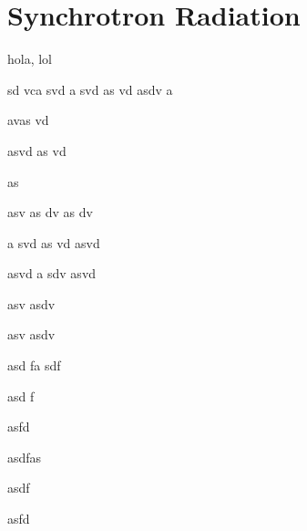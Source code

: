 \chapter{Synchrotron Radiation}

\label{c:sr} %


hola, lol


sd
vca
svd
a
svd
as
vd
asdv
a

avas
vd

asvd
as
vd

as

asv
as
dv
as
dv

a
svd
as
vd
asvd



asvd
a
sdv
asvd


asv
asdv



asv
asdv


asd
fa
sdf

asd
f

asfd

asdfas

asdf

asfd
